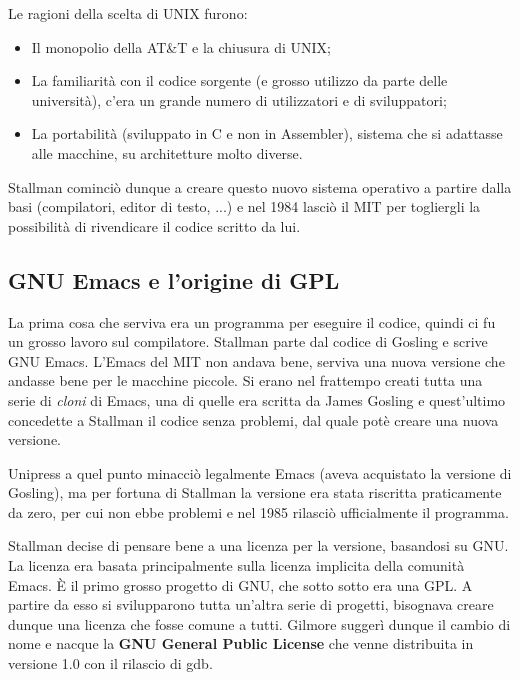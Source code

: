 Le ragioni della scelta di UNIX furono:

\begin{itemize}
	\item Il monopolio della AT\&T e la chiusura di UNIX;
	\item La familiarità con il codice sorgente (e grosso utilizzo da parte delle università), c'era un grande numero di utilizzatori e di sviluppatori;
	\item La portabilità (sviluppato in C e non in Assembler), sistema che si adattasse alle macchine, su architetture molto diverse.
	
\end{itemize}

Stallman cominciò dunque a creare questo nuovo sistema operativo a partire dalla basi (compilatori, editor di testo, ...) e nel 1984 lasciò il MIT per togliergli la possibilità di rivendicare il codice scritto da lui. 

\subsection{GNU Emacs e l'origine di GPL}

La prima cosa che serviva era un programma per eseguire il codice, quindi ci fu un grosso lavoro sul compilatore. Stallman parte dal codice di Gosling e scrive GNU Emacs. L'Emacs del MIT non andava bene, serviva una nuova versione che andasse bene per le macchine piccole. Si erano nel frattempo creati tutta una serie di \textit{cloni} di Emacs, una di quelle era scritta da James Gosling e quest'ultimo concedette a Stallman il codice senza problemi, dal quale potè creare una nuova versione.

Unipress a quel punto minacciò legalmente Emacs (aveva acquistato la versione di Gosling), ma per fortuna di Stallman la versione era stata riscritta praticamente da zero, per cui non ebbe problemi e nel 1985 rilasciò ufficialmente il programma. 

Stallman decise di pensare bene a una licenza per la versione, basandosi su GNU. La licenza era basata principalmente sulla licenza implicita della comunità Emacs. È il primo grosso progetto di GNU, che sotto sotto era una GPL. A partire da esso si svilupparono tutta un'altra serie di progetti, bisognava creare dunque una licenza che fosse comune a tutti. Gilmore suggerì dunque il cambio di nome e nacque la \textbf{GNU General Public License} che venne distribuita in versione 1.0 con il rilascio di gdb.


